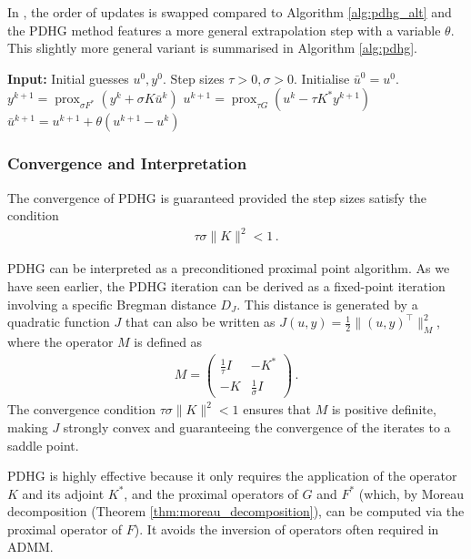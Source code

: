 In \cite{Chambolle2011PDHG}, the order of updates is swapped compared to Algorithm \ref{alg:pdhg_alt} and the PDHG method features a more general extrapolation step with a variable $\theta$. This slightly more general variant is summarised in Algorithm \ref{alg:pdhg}.
\begin{algorithm}
\caption{Primal-Dual Hybrid Gradient (PDHG) / Chambolle-Pock -- General Extrapolation}\label{alg:pdhg}
\begin{algorithmic}
\State \textbf{Input:} Initial guesses $u^0, y^0$. Step sizes $\tau > 0, \sigma > 0$. Initialise $\bar{u}^0 = u^0$.
\State $y^{k+1} = \operatorname{prox}_{\sigma F^*}(y^k + \sigma K \bar{u}^k)$ 
\State $u^{k+1} = \operatorname{prox}_{\tau G}(u^k - \tau K^* y^{k+1})$ 
\State $\bar{u}^{k+1} = u^{k+1} + \theta (u^{k+1} - u^k)$ 
\EndFor
\end{algorithmic}
\end{algorithm}

\subsubsection{Convergence and Interpretation}
The convergence of PDHG is guaranteed provided the step sizes satisfy the condition
\begin{align*}
\tau \sigma \|K\|^2 < 1 \, .
\end{align*}

PDHG can be interpreted as a preconditioned proximal point algorithm. As we have seen earlier, the PDHG iteration can be derived as a fixed-point iteration involving a specific Bregman distance $D_J$. This distance is generated by a quadratic function $J$ that can also be written as $J(u, y) = \frac{1}{2}\|(u, y)^\top\|_M^2$, where the operator $M$ is defined as
\begin{align*}
M = \begin{pmatrix} \frac{1}{\tau}I & -K^* \\ -K & \frac{1}{\sigma}I \end{pmatrix} \, .
\end{align*}
The convergence condition $\tau \sigma \|K\|^2 < 1$ ensures that $M$ is positive definite, making $J$ strongly convex and guaranteeing the convergence of the iterates to a saddle point.

PDHG is highly effective because it only requires the application of the operator $K$ and its adjoint $K^*$, and the proximal operators of $G$ and $F^*$ (which, by Moreau decomposition (Theorem \ref{thm:moreau_decomposition}), can be computed via the proximal operator of $F$). It avoids the inversion of operators often required in ADMM.

